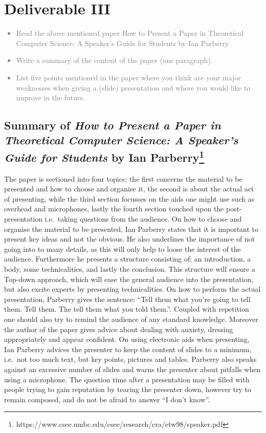 \chapter{Deliverable III}
\textcolor{gray}{%
\begin{itemize}
    \item Read the above mentioned paper How to Present a Paper in Theoretical Computer Science: A Speaker’s Guide for Students by Ian Parberry.
    \item Write a summary of the content of the paper (one paragraph).
    \item List five points mentioned in the paper where you think are your major weaknesses when giving a (slide) presentation and where you would like to improve in the future.
\end{itemize}}
\section{Summary of \textit{How to Present a Paper in Theoretical Computer Science: A Speaker’s Guide for Students} by Ian Parberry\footnote{https://www.csee.umbc.edu/csee/research/cra/etw98/speaker.pdf}}
The paper is sectioned into four topics; the first concerns the material to be presented and how to choose and organise it, the second is about the actual act of presenting, while the third section focusses on the aids one might use such as overhead and microphones, lastly the fourth section touched upon the post-presentation i.e.\ taking questions from the audience.
On how to choose and organise the material to be presented, Ian Parberry states that it is important to present key ideas and not the obvious.
He also underlines the importance of not going into to many details, as this will only help to loose the interest of the audience.
Furthermore he presents a structure consisting of; an introduction, a body, some technicalities, and lastly the conclusion.
This structure will ensure a Top-down approach, which will ease the general audience into the presentation, but also excite experts by presenting technicalities.
On how to perform the actual presentation, Parberry gives the sentence: \enquote{Tell them what you're going to tell them. Tell them. The tell them what you told them.}.
Coupled with repetition one should also try to remind the audience of any standard knowledge.
Moreover the author of the paper gives advice about dealing with anxiety, dressing appropriately and appear confident.
On using electronic aids when presenting, Ian Parberry advices the presenter to keep the content of slides to a minimum, i.e.\ not too much text, but key points, pictures and tables.
Parberry also speaks against an excessive number of slides and warns the presenter about pitfalls when using a microphone.
The question time after a presentation may be filled with people trying to gain reputation by tearing the presenter down, however try to remain composed, and do not be afraid to answer \enquote{I don't know}.
